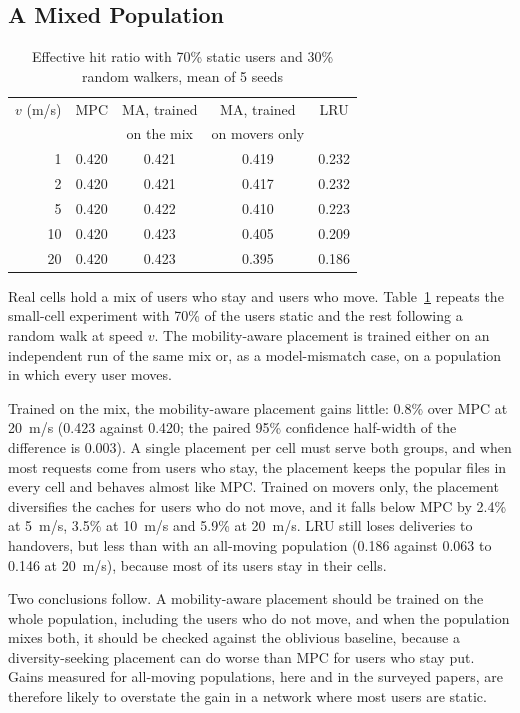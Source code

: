 \subsection{A Mixed Population}
\label{subsec:mixed}

\begin{table}[t]
\centering
\caption{Effective hit ratio with 70\% static users and 30\% random walkers, mean of 5 seeds}
\label{tab:mixed}
\footnotesize
\renewcommand{\arraystretch}{1.1}
\begin{tabular}{rcccc}
\hline
$v$ (m/s) & MPC & MA, trained & MA, trained & LRU \\
 & & on the mix & on movers only & \\
\hline
1 & 0.420 & 0.421 & 0.419 & 0.232 \\
2 & 0.420 & 0.421 & 0.417 & 0.232 \\
5 & 0.420 & 0.422 & 0.410 & 0.223 \\
10 & 0.420 & 0.423 & 0.405 & 0.209 \\
20 & 0.420 & 0.423 & 0.395 & 0.186 \\
\hline
\end{tabular}
\end{table}

Real cells hold a mix of users who stay and users who move. Table~\ref{tab:mixed} repeats the small-cell experiment with 70\% of the users static and the rest following a random walk at speed $v$. The mobility-aware placement is trained either on an independent run of the same mix or, as a model-mismatch case, on a population in which every user moves.

Trained on the mix, the mobility-aware placement gains little: 0.8\% over MPC at 20~m/s (0.423 against 0.420; the paired 95\% confidence half-width of the difference is 0.003). A single placement per cell must serve both groups, and when most requests come from users who stay, the placement keeps the popular files in every cell and behaves almost like MPC. Trained on movers only, the placement diversifies the caches for users who do not move, and it falls below MPC by 2.4\% at 5~m/s, 3.5\% at 10~m/s and 5.9\% at 20~m/s. LRU still loses deliveries to handovers, but less than with an all-moving population (0.186 against 0.063 to 0.146 at 20~m/s), because most of its users stay in their cells.

Two conclusions follow. A mobility-aware placement should be trained on the whole population, including the users who do not move, and when the population mixes both, it should be checked against the oblivious baseline, because a diversity-seeking placement can do worse than MPC for users who stay put. Gains measured for all-moving populations, here and in the surveyed papers, are therefore likely to overstate the gain in a network where most users are static.
